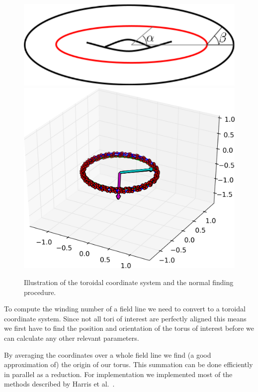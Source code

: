 \documentclass[a4paper]{article}
\begin{document}
\begin{figure}[!htb]
  \includegraphics[width=\linewidth]{Figures/TorusAlphaBeta.pdf}
\endminipage\hfill
{}
  \includegraphics[width=\linewidth]{Figures/torusfit3.png}
\endminipage
	\caption{Illustration of the toroidal coordinate system and the normal finding procedure.}\label{fig:coordsys}
\end{figure}

To compute the winding number of a field line we need to convert to a toroidal coordinate system. Since not all tori of interest are perfectly aligned this means we first have to find the position and orientation of the torus of interest before we can calculate any other relevant parameters.

By averaging the coordinates over a whole field line we find (a good approximation of) the origin of our torus. This summation can be done efficiently in parallel as a reduction. For implementation we implemented most of the methods described by Harris et al.~\cite{harris2007optimizing}.
\end{document}
